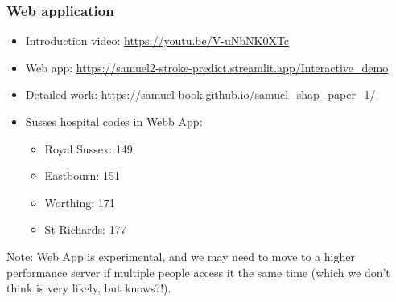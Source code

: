 \begin{frame}
\frametitle{Web application}

\begin{itemize}
    \item Introduction video: \url{https://youtu.be/V-uNbNK0XTc}
    \item Web app: \url{https://samuel2-stroke-predict.streamlit.app/Interactive_demo}
    \item Detailed work: \url{https://samuel-book.github.io/samuel_shap_paper_1/}
    \item Susses hospital codes in Webb App:
    \begin{itemize}
        \item Royal Sussex: 149
        \item Eastbourn: 151
        \item Worthing: 171
        \item St Richards: 177
    \end{itemize}
\end{itemize}

\vspace{3mm}
Note: Web App is experimental, and we may need to move to a higher performance server if multiple people access it the same time (which we don't think is very likely, but knows?!).
 
\end{frame}